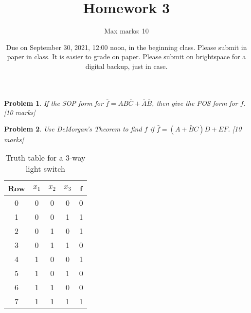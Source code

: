 \documentclass[twocolumn]{article}
\title{Homework 3}
\author{Max marks: 10}
\date{Due on September 30, 2021, 12:00 noon, in the beginning class. Please submit in paper
 in class. It is easier to grade on paper. Please submit on brightspace for a
digital backup, just in case.}
\newtheorem{prob}{Problem}
\newcommand{\bA}{\bar{A}}
\newcommand{\bB}{\bar{B}}
\newcommand{\bC}{\bar{C}}
\begin{document}
\maketitle

\begin{prob}
If the SOP form for $ \bar{f} = AB\bC+\bA\bB$, then give the POS form for
$f$. [10 marks]
\end{prob}

\begin{prob}
Use DeMorgan's Theorem to find $f$  if  $\bar{f} = (A + \bB C)D + EF$. [10 marks]
\end{prob}



\begin{table}
  \centering
  \begin{tabular}{c|ccc||c}
    \toprule
    Row & $x_1$ & $x_2$ & $x_3$ & f \\
    \midrule
    0 & 0 & 0 & 0 & 0 \\
    1 & 0 & 0 & 1 & 1 \\
    2 & 0 & 1 & 0 & 1 \\
    3 & 0 & 1 & 1 & 0 \\
    4 & 1 & 0 & 0 & 1 \\
    5 & 1 & 0 & 1 & 0 \\
    6 & 1 & 1 & 0 & 0 \\
    7 & 1 & 1 & 1 & 1 \\
    \bottomrule
    \end{tabular}
    \caption{Truth table for a 3-way light switch}
    \label{tab:3-way-light-switch}
\end{table}
\end{document}
